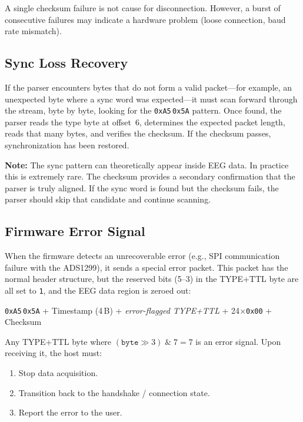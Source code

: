 \documentclass[11pt,a4paper]{article}
\newcommand{\hexval}[1]{\texttt{0x#1}}
\newcommand{\notebox}[1]{\par\medskip\noindent\colorbox{backgray}{\parbox{\dimexpr\linewidth-2\fboxsep}{\textbf{Note:} #1}}\medskip}
\begin{document}
A single checksum failure is not cause for disconnection.  However, a burst of consecutive failures may indicate a hardware problem (loose connection, baud rate mismatch).

\subsection{Sync Loss Recovery}

If the parser encounters bytes that do not form a valid packet---for example, an unexpected byte where a sync word was expected---it must scan forward through the stream, byte by byte, looking for the \hexval{A5}\,\hexval{5A} pattern.  Once found, the parser reads the type byte at offset~6, determines the expected packet length, reads that many bytes, and verifies the checksum.  If the checksum passes, synchronization has been restored.

\notebox{The sync pattern can theoretically appear inside EEG data.  In practice this is extremely rare.  The checksum provides a secondary confirmation that the parser is truly aligned.  If the sync word is found but the checksum fails, the parser should skip that candidate and continue scanning.}

\subsection{Firmware Error Signal}
\label{sec:error-signal}

When the firmware detects an unrecoverable error (e.g., SPI communication failure with the ADS1299), it sends a special error packet.  This packet has the normal header structure, but the reserved bits (5--3) in the TYPE+TTL byte are all set to \texttt{1}, and the EEG data region is zeroed out:

\begin{center}
\hexval{A5}\,\hexval{5A} + Timestamp (4\,B) + \textit{error-flagged TYPE+TTL} + 24$\times$\hexval{00} + Checksum
\end{center}

Any TYPE+TTL byte where $(\texttt{byte} \gg 3) \;\&\; 7 = 7$ is an error signal.  Upon receiving it, the host must:

\begin{enumerate}
    \item Stop data acquisition.
    \item Transition back to the handshake / connection state.
    \item Report the error to the user.
\end{enumerate}
\end{document}
